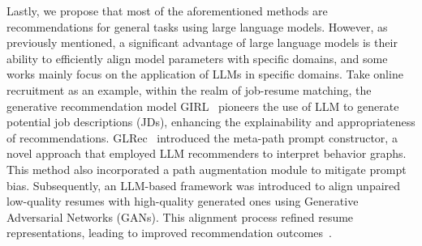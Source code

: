 \documentclass[sn-mathphys-num]{sn-jnl}%
\theoremstyle{thmstyleone}%
\theoremstyle{thmstyletwo}%
\theoremstyle{thmstylethree}%
\begin{document}
Lastly, we propose that most of the aforementioned methods are recommendations for general tasks using large language models. However, as previously mentioned, a significant advantage of large language models is their ability to efficiently align model parameters with specific domains, and some works mainly focus on the application of LLMs in specific domains. Take online recruitment as an example, within the realm of job-resume matching, the generative recommendation model GIRL~\cite{zheng2023generative} pioneers the use of LLM to generate potential job descriptions (JDs), enhancing the explainability and appropriateness of recommendations. GLRec~\cite{wu2023exploring} introduced the meta-path prompt constructor, a novel approach that employed LLM recommenders to interpret behavior graphs. This method also incorporated a path augmentation module to mitigate prompt bias. Subsequently, an LLM-based framework was introduced to align unpaired low-quality resumes with high-quality generated ones using Generative Adversarial Networks (GANs). This alignment process refined resume representations, leading to improved recommendation outcomes~\cite{du2023enhancing}.
\end{document}
